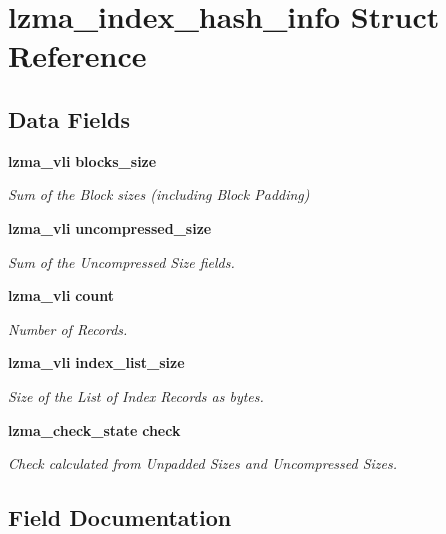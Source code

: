 \section{lzma\-\_\-index\-\_\-hash\-\_\-info Struct Reference}
\label{structlzma__index__hash__info}
\subsection*{Data Fields}
\begin{DoxyCompactItemize}
\item 
{\bf lzma\-\_\-vli} {\bf blocks\-\_\-size}
\begin{DoxyCompactList}\small\item\em Sum of the Block sizes (including Block Padding) \end{DoxyCompactList}\item 
{\bf lzma\-\_\-vli} {\bf uncompressed\-\_\-size}
\begin{DoxyCompactList}\small\item\em Sum of the Uncompressed Size fields. \end{DoxyCompactList}\item 
{\bf lzma\-\_\-vli} {\bf count}
\begin{DoxyCompactList}\small\item\em Number of Records. \end{DoxyCompactList}\item 
{\bf lzma\-\_\-vli} {\bf index\-\_\-list\-\_\-size}
\begin{DoxyCompactList}\small\item\em Size of the List of Index Records as bytes. \end{DoxyCompactList}\item 
{\bf lzma\-\_\-check\-\_\-state} {\bf check}
\begin{DoxyCompactList}\small\item\em Check calculated from Unpadded Sizes and Uncompressed Sizes. \end{DoxyCompactList}\end{DoxyCompactItemize}


\subsection{Field Documentation}
